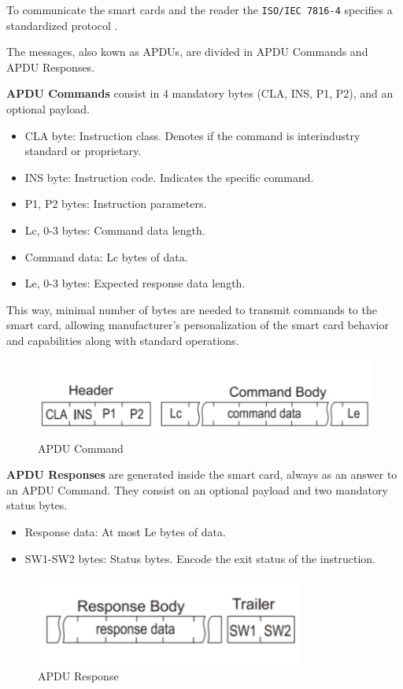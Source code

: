 To communicate the smart cards and the reader the \texttt{ISO/IEC 7816-4} \citep{APDUISO} specifies a standardized protocol .

The messages, also kown as \acp{APDU}, are divided in APDU Commands and APDU Responses.

\textbf{APDU Commands} consist in 4 mandatory bytes (CLA, INS, P1, P2), and an optional payload.

\begin{itemize}
	\item CLA byte: Instruction class. Denotes if the command is interindustry standard or proprietary.
	\item INS byte: Instruction code. Indicates the specific command.
	\item P1, P2 bytes: Instruction parameters.
	\item Lc, 0-3 bytes: Command data length.
	\item Command data: Lc bytes of data.
	\item Le, 0-3 bytes: Expected response data length.
\end{itemize}

This way, minimal number of bytes are needed to transmit commands to the smart card, allowing manufacturer's personalization of the smart card behavior and capabilities along with standard operations.

\begin{figure}[bth]
	\begin{center}
		\includegraphics[width=0.55\linewidth]{gfx/APDUCommand}
	\end{center}
	\caption{APDU Command}
	\label{fig:APDUCommand}
\end{figure}


\textbf{APDU Responses} are generated inside the smart card, always as an answer to an APDU Command. They consist on an optional payload and two mandatory status bytes.


\begin{itemize}
	\item Response data: At most Le bytes of data.
	\item SW1-SW2 bytes: Status bytes. Encode the exit status of the instruction.
\end{itemize}

\begin{figure}[bth]
	\begin{center}
		\includegraphics[width=0.55\linewidth]{gfx/APDUResponse}
	\end{center}
	\caption{APDU Response}
	\label{fig:APDUResponse}
\end{figure}




